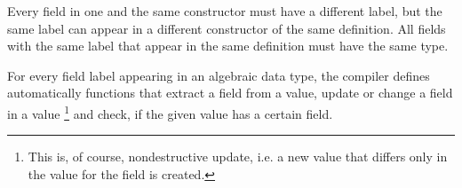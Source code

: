 

Every field in one and the same constructor must have a different label, but the same label can appear in a different constructor of the same  definition. 
All fields with the same label that appear in the same  definition must have the same type.


For every field label appearing in an algebraic data type, 
the compiler defines automatically functions that extract a field from a value,
update or change a field in a value
\footnote{This is, of course, nondestructive update, i.e. a new value that differs only in the value for the field is created.} 
and check, if the given value has a certain field.


